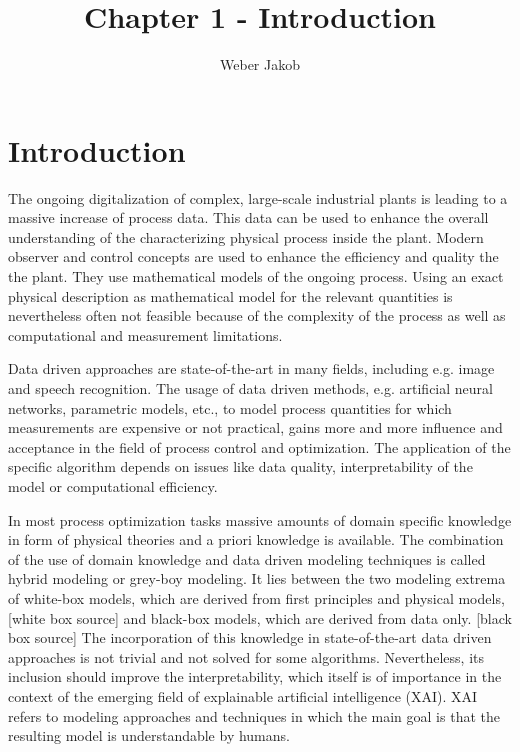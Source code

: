 \documentclass[10pt,a4paper]{article}
\title{Chapter 1 - Introduction}
\author{Weber Jakob}
\begin{document}
	\maketitle

\section{Introduction}

The ongoing digitalization of complex, large-scale industrial plants is leading to a massive increase of process data. This data can be used to enhance the overall understanding of the characterizing physical process inside the plant. Modern observer and control concepts are used to enhance the efficiency and quality the the plant. They use mathematical models of the ongoing process. Using an exact physical description as mathematical model for the relevant quantities is nevertheless often not feasible because of the complexity of the process as well as computational and measurement limitations.

Data driven approaches are state-of-the-art in many fields, including e.g. image and speech recognition. The usage of data driven methods, e.g. artificial neural networks, parametric models, etc., to model process quantities for which measurements are expensive or not practical, gains more and more influence and acceptance in the field of process control and optimization. The application of the specific algorithm depends on issues like data quality, interpretability of the model or computational efficiency. 

In most process optimization tasks massive amounts of domain specific knowledge in form of physical theories and a priori knowledge is available. The combination of the use of domain knowledge and data driven modeling techniques is called hybrid modeling or grey-boy modeling. It lies between the two modeling extrema of white-box models, which are derived from first principles and physical models, [white box source] and black-box models, which are derived from data only. [black box source] The incorporation of this knowledge in state-of-the-art data driven approaches is not trivial and not solved for some algorithms. Nevertheless, its inclusion should improve the interpretability, which itself is of importance in the context of the emerging field of explainable artificial intelligence (XAI). XAI refers to modeling approaches and techniques in which the main goal is that the resulting model is understandable by humans. 
\end{document}
